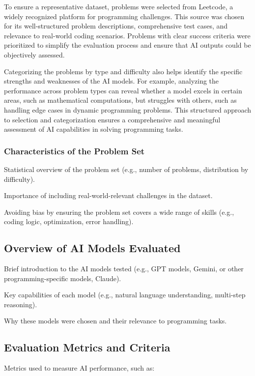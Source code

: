 To ensure a representative dataset, problems were selected from Leetcode, a widely recognized platform for programming challenges. This source was chosen for its well-structured problem descriptions, comprehensive test cases, and relevance to real-world coding scenarios. Problems with clear success criteria were prioritized to simplify the evaluation process and ensure that AI outputs could be objectively assessed.

Categorizing the problems by type and difficulty also helps identify the specific strengths and weaknesses of the AI models. For example, analyzing the performance across problem types can reveal whether a model excels in certain areas, such as mathematical computations, but struggles with others, such as handling edge cases in dynamic programming problems. This structured approach to selection and categorization ensures a comprehensive and meaningful assessment of AI capabilities in solving programming tasks.

\subsubsection{Characteristics of the Problem Set}

Statistical overview of the problem set (e.g., number of problems, distribution by difficulty).

Importance of including real-world-relevant challenges in the dataset.

Avoiding bias by ensuring the problem set covers a wide range of skills (e.g., coding logic, optimization, error handling).

\subsection{Overview of AI Models Evaluated}

Brief introduction to the AI models tested (e.g., GPT models, Gemini, or other programming-specific models, Claude).

Key capabilities of each model (e.g., natural language understanding, multi-step reasoning).

Why these models were chosen and their relevance to programming tasks.

\subsection{Evaluation Metrics and Criteria}

Metrics used to measure AI performance, such as:

